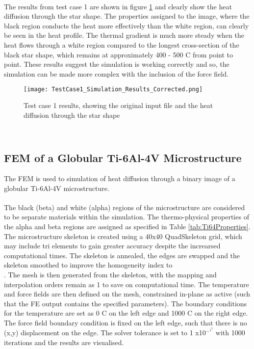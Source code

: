 \documentclass[report.tex]{subfiles}
\begin{document}
\\
The results from test case 1 are shown in figure \ref{fig:TestCase1Results} and clearly show the heat diffusion through the star shape. The properties assigned to the image, where the black region conducts the heat more effectively than the white region, can clearly be seen in the heat profile. The thermal gradient is much more steady when the heat flows through a white region compared to the longest cross-section of the black star shape, which remains at approximately 400 - 500 \degree C from point to point. These results suggest the simulation is working correctly and so, the simulation can be made more complex with the inclusion of the force field.
\\
\begin{figure}[h]
    \centering
    \texttt{[image: TestCase1\_Simulation\_Results\_Corrected.png]}
    \caption{Test case 1 results, showing the original input file and the heat diffusion through the star shape}
    \label{fig:TestCase1Results}
\end{figure}
\\

\subsection{FEM of a Globular Ti-6Al-4V Microstructure}

The FEM is used to simulation of heat diffusion through a binary image of a globular Ti-6Al-4V microstructure.\\ %
\\
The black (beta) and white (alpha) regions of the microstructure are considered to be separate materials within the simulation. The thermo-physical properties of the alpha and beta regions are assigned as specified in Table \ref{tab:Ti64Properties}. The microstructure skeleton is created using a 40x40 QuadSkeleton grid, which may include tri elements to gain greater accuracy despite the increarsed computational times. The skeleton is annealed, the edges are swapped and the skeleton smoothed to improve the homogeneity index to \\. The mesh is then generated from the skeleton, with the mapping and interpolation orders remain as 1 to save on computational time. The temperature and force fields are then defined on the mesh, constrained in-plane as active (such that the FE output contains the specified parameters). The boundary conditions for the temperature are set as 0 \degree C on the left edge and 1000 \degree C on the right edge. The force field boundary condition is fixed on the left edge, such that there is no (x,y) displacement on the edge. The solver tolerance is set to 1 x10$^-^1^3$ with 1000 iterations and the results are visualised.
\end{document}
